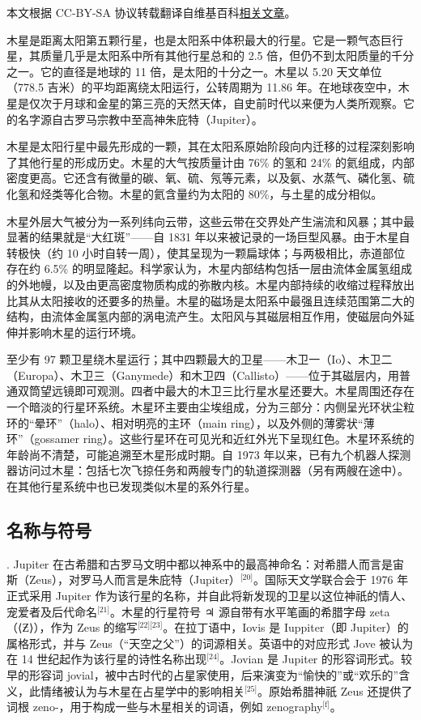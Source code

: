 
本文根据 CC-BY-SA 协议转载翻译自维基百科\href{https://en.wikipedia.org/wiki/Jupiter}{相关文章}。


木星是距离太阳第五颗行星，也是太阳系中体积最大的行星。它是一颗气态巨行星，其质量几乎是太阳系中所有其他行星总和的 2.5 倍，但仍不到太阳质量的千分之一。它的直径是地球的 11 倍，是太阳的十分之一。木星以 5.20 天文单位（778.5 吉米）的平均距离绕太阳运行，公转周期为 11.86 年。在地球夜空中，木星是仅次于月球和金星的第三亮的天然天体，自史前时代以来便为人类所观察。它的名字源自古罗马宗教中至高神朱庇特（Jupiter）。

木星是太阳行星中最先形成的一颗，其在太阳系原始阶段向内迁移的过程深刻影响了其他行星的形成历史。木星的大气按质量计由 76\% 的氢和 24\% 的氦组成，内部密度更高。它还含有微量的碳、氧、硫、氖等元素，以及氨、水蒸气、磷化氢、硫化氢和烃类等化合物。木星的氦含量约为太阳的 80\%，与土星的成分相似。

木星外层大气被分为一系列纬向云带，这些云带在交界处产生湍流和风暴；其中最显著的结果就是“大红斑”——自 1831 年以来被记录的一场巨型风暴。由于木星自转极快（约 10 小时自转一周），使其呈现为一颗扁球体；与两极相比，赤道部位存在约 6.5\% 的明显隆起。科学家认为，木星内部结构包括一层由流体金属氢组成的外地幔，以及由更高密度物质构成的弥散内核。木星内部持续的收缩过程释放出比其从太阳接收的还要多的热量。木星的磁场是太阳系中最强且连续范围第二大的结构，由流体金属氢内部的涡电流产生。太阳风与其磁层相互作用，使磁层向外延伸并影响木星的运行环境。

至少有 97 颗卫星绕木星运行；其中四颗最大的卫星——木卫一（Io）、木卫二（Europa）、木卫三（Ganymede）和木卫四（Callisto）——位于其磁层内，用普通双筒望远镜即可观测。四者中最大的木卫三比行星水星还要大。木星周围还存在一个暗淡的行星环系统。木星环主要由尘埃组成，分为三部分：内侧呈光环状尘粒环的“晕环”（halo）、相对明亮的主环（main ring），以及外侧的薄雾状“薄环”（gossamer ring）。这些行星环在可见光和近红外光下呈现红色。木星环系统的年龄尚不清楚，可能追溯至木星形成时期。自 1973 年以来，已有九个机器人探测器访问过木星：包括七次飞掠任务和两艘专门的轨道探测器（另有两艘在途中）。在其他行星系统中也已发现类似木星的系外行星。
\subsection{名称与符号}.
Jupiter 在古希腊和古罗马文明中都以神系中的最高神命名：对希腊人而言是宙斯（Zeus），对罗马人而言是朱庇特（Jupiter）\(^\text{[20]}\)。国际天文学联合会于 1976 年正式采用 Jupiter 作为该行星的名称，并自此将新发现的卫星以这位神祇的情人、宠爱者及后代命名\(^\text{[21]}\)。木星的行星符号 ♃ 源自带有水平笔画的希腊字母 zeta（⟨Ƶ⟩），作为 Zeus 的缩写\(^\text{[22][23]}\)。在拉丁语中，Iovis 是 Iuppiter（即 Jupiter）的属格形式，并与 Zeus（“天空之父”）的词源相关。英语中的对应形式 Jove 被认为在 14 世纪起作为该行星的诗性名称出现\(^\text{[24]}\)。Jovian 是 Jupiter 的形容词形式。较早的形容词 jovial，被中古时代的占星家使用，后来演变为“愉快的”或“欢乐的”含义，此情绪被认为与木星在占星学中的影响相关\(^\text{[25]}\)。原始希腊神祇 Zeus 还提供了词根 zeno-，用于构成一些与木星相关的词语，例如 zenography\(^\text{[f]}\)。






